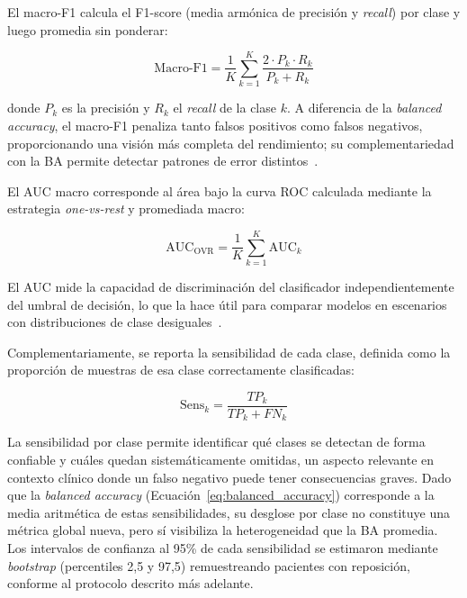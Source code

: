 El macro-F1 calcula el F1-score (media armónica de precisión y \textit{recall}) por clase y luego promedia sin ponderar:

\begin{equation}
    \text{Macro-F1} = \frac{1}{K} \sum_{k=1}^{K} \frac{2 \cdot P_k \cdot R_k}{P_k + R_k}
    \label{eq:macro_f1}
\end{equation}

donde $P_k$ es la precisión y $R_k$ el \textit{recall} de la clase $k$. A diferencia de la \textit{balanced accuracy}, el macro-F1 penaliza tanto falsos positivos como falsos negativos, proporcionando una visión más completa del rendimiento; su complementariedad con la BA permite detectar patrones de error distintos~\parencite{chen2023algorithmic}. 

El AUC macro corresponde al área bajo la curva ROC calculada mediante la estrategia \textit{one-vs-rest} y promediada macro:

\begin{equation}
    \text{AUC}_{\text{OVR}} = \frac{1}{K} \sum_{k=1}^{K} \text{AUC}_k
    \label{eq:macro_auc}
\end{equation}

El AUC mide la capacidad de discriminación del clasificador independientemente del umbral de decisión, lo que la hace útil para comparar modelos en escenarios con distribuciones de clase desiguales~\parencite{NEURIPS2024_c9826b9e}. 

Complementariamente, se reporta la sensibilidad de cada clase, definida como la proporción de muestras de esa clase correctamente clasificadas:

\begin{equation}
    \text{Sens}_k = \frac{TP_k}{TP_k + FN_k}
    \label{eq:sensibilidad}
\end{equation}

La sensibilidad por clase permite identificar qué clases se detectan de forma confiable y cuáles quedan sistemáticamente omitidas, un aspecto relevante en contexto clínico donde un falso negativo puede tener consecuencias graves. Dado que la \textit{balanced accuracy} (Ecuación~\ref{eq:balanced_accuracy}) corresponde a la media aritmética de estas sensibilidades, su desglose por clase no constituye una métrica global nueva, pero sí visibiliza la heterogeneidad que la BA promedia. Los intervalos de confianza al 95\% de cada sensibilidad se estimaron mediante \textit{bootstrap} (percentiles 2,5 y 97,5) remuestreando pacientes con reposición, conforme al protocolo descrito más adelante.

